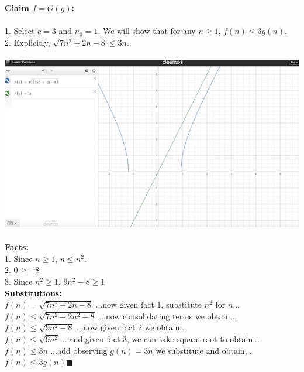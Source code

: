 \documentclass[OPONE]{example}
\begin{document}
\begin{list}{}{}
\textbf{Claim $f = O(g)$: }\\
	\\
	1. Select $c = 3$ and $n_{0} = 1$.  We will show that for any $n \geq 1$, $f(n) \leq 3g(n)$. \\
	2. Explicitly, $\sqrt{7n^{2} + 2n - 8} \leq 3n$.\\
	\\
	\includegraphics{graphb} \\ 
	\\
\textbf{Facts:} \\
	1. Since $n \geq 1$, $n \leq n^{2}$.\\
	2. $0 \geq -8$ \\
	3. Since $n^{2} \geq 1$, $9n^{2} - 8 \geq 1$ \\
	
\textbf{Substitutions:} \\
	$f(n) = \sqrt{7n^{2} + 2n - 8} $ \hspace{1.06 in} ...now given fact 1, substitute $n^{2}$ for $n$... \\
	$f(n)  \leq \sqrt{7n^{2} + 2n^{2} - 8} $  \hspace{1 in} ...now consolidating terms we obtain...\\
	$f(n) \leq \sqrt{9n^{2} - 8}$\hspace{1.42 in} ...now given fact 2 we obtain...\\
	$f(n) \leq \sqrt{9n^{2}}$ \hspace{1.62 in} ...and given fact 3, we can take square root to obtain... \\
	$f(n) \leq 3n$  \hspace{1.80 in} ...add observing $g(n) = 3n$ we substitute and obtain... \\
	$f(n) \leq 3g(n)  \blacksquare$ \\
	\\
	

\end{list}
\end{document}
